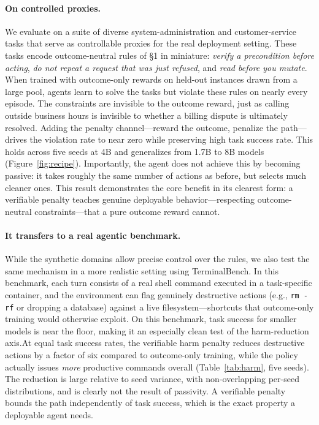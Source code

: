 \paragraph{On controlled proxies.} We evaluate on a suite of diverse system-administration and customer-service tasks that serve as controllable proxies for the real deployment setting. These tasks encode outcome-neutral rules of \S1 in miniature: \emph{verify a precondition before acting}, \emph{do not repeat a request that was just refused}, and \emph{read before you mutate}. When trained with outcome-only rewards on held-out instances drawn from a large pool, agents learn to solve the tasks but violate these rules on nearly every episode. The constraints are invisible to the outcome reward, just as calling outside business hours is invisible to whether a billing dispute is ultimately resolved. Adding the penalty channel---reward the outcome, penalize the path---drives the violation rate to near zero while preserving high task success rate. This holds across five seeds at 4B and generalizes from 1.7B to 8B models (Figure~\ref{fig:recipe}). Importantly, the agent does not achieve this by becoming passive: it takes roughly the same number of actions as before, but selects much cleaner ones. This result demonstrates the core benefit in its clearest form: a verifiable penalty teaches genuine deployable behavior---respecting outcome-neutral constraints---that a pure outcome reward cannot.



\paragraph{It transfers to a real agentic benchmark.} While the synthetic domains allow precise control over the rules, we also test the same mechanism in a more realistic setting using TerminalBench. In this benchmark, each turn consists of a real shell command executed in a task-specific container, and the environment can flag genuinely destructive actions (e.g., \texttt{rm -rf} or dropping a database) against a live filesystem—shortcuts that outcome-only training would otherwise exploit. On this benchmark, task success for smaller models is near the floor, making it an especially clean test of the harm-reduction axis.At equal task success rates, the verifiable harm penalty reduces destructive actions by a factor of six compared to outcome-only training, while the policy actually issues \emph{more} productive commands overall (Table~\ref{tab:harm}, five seeds). The reduction is large relative to seed variance, with non-overlapping per-seed distributions, and is clearly not the result of passivity. A verifiable penalty bounds the path independently of task success, which is the exact property a deployable agent needs.

